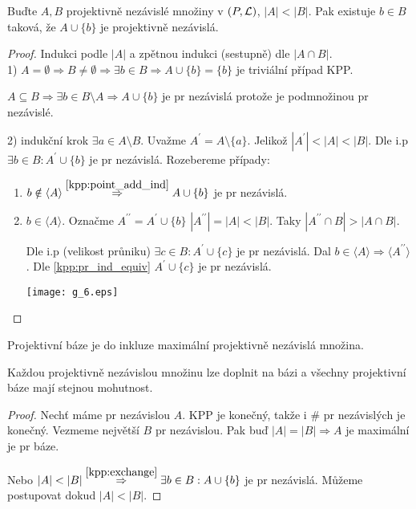 \begin{theorem}[O výměně]\label{kpp:exchange}
    Buďte $A,B$ projektivně nezávislé množiny v $(P,\operatorname{\mathcal{L}})$, $|A| < |B|$.
    Pak existuje $b\in B$ taková, že $A\cup\{b\}$ je projektivně nezávislá.
\end{theorem}
\begin{proof}
	Indukci podle $|A|$ a zpětnou indukci (sestupně) dle $|A \cap B|$.\\
	1) $A = \emptyset \Rightarrow B \ne \emptyset \Rightarrow \exists b \in B \Rightarrow A \cup \{ b \} = \{ b \}$ je triviální případ KPP.

	$A \subseteq B \Rightarrow \exists b \in B \setminus A \Rightarrow A \cup \{ b \}$ je pr nezávislá protože je podmnožinou pr nezávislé.

	2) indukční krok $\exists a \in A \setminus B$.
	Uvažme $A^{\prime} = A \setminus \{ a \}$.
	Jelikož $|A^{\prime}| < |A| < |B|$.
	Dle i.p $\exists b \in B: A^{\prime} \cup \{ b \}$ je pr nezávislá.
	Rozebereme případy:
	\begin{enumerate}
		\item $b \notin \langle A \rangle \stackrel{\cref{kpp:point_add_ind}}{\Rightarrow} A \cup \{ b \}$ je pr nezávislá.
		\item $b \in \langle A \rangle$.
			Označme $A^{\prime\prime} = A^{\prime} \cup \{ b \}$
			$|A^{\prime\prime}| = |A| < |B|$.
			Taky $|A^{\prime\prime} \cap B| > |A \cap B|$.

			Dle i.p (velikost průniku) $\exists c \in B: A^{\prime} \cup \{ c \}$ je pr nezávislá.
			Dal $b \in \langle A \rangle \Rightarrow \langle A^{\prime\prime} \rangle$.
			Dle \cref{kpp:pr_ind_equiv} $A^{\prime} \cup \{ c \}$ je pr nezávislá.

		\texttt{[image: g\_6.eps]}
	\end{enumerate}
\end{proof}

\begin{definition}
    Projektivní báze je do inkluze maximální projektivně nezávislá množina.
\end{definition}

\begin{consequence}\label{kpp:basis}
    Každou projektivně nezávislou množinu lze doplnit na bázi a všechny projektivní báze mají stejnou mohutnost.
\end{consequence}
\begin{proof}
	Nechť máme pr nezávislou $A$.
	KPP je konečný, takže i \# pr nezávislých je konečný.
	Vezmeme největší $B$ pr nezávislou.
	Pak buď $|A| = |B| \Rightarrow A$ je maximální je pr báze.

	Nebo $|A| < |B| \stackrel{\cref{kpp:exchange}}{\Rightarrow} \exists b \in B: A \cup \{ b \}$ je pr nezávislá.
	Můžeme postupovat dokud $|A| < |B|$.
\end{proof}


